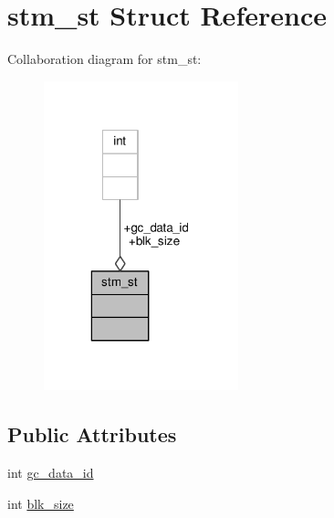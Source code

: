 \hypertarget{structstm__st}{\section{stm\-\_\-st Struct Reference}
\label{structstm__st}
}


Collaboration diagram for stm\-\_\-st\-:
\nopagebreak
\begin{figure}[H]
\begin{center}
\leavevmode
\includegraphics[width=160pt]{structstm__st__coll__graph}
\end{center}
\end{figure}
\subsection*{Public Attributes}
\begin{DoxyCompactItemize}
\item 
int \hyperlink{structstm__st_a8d4aa8ea05094df2806473132aacf807}{gc\-\_\-data\-\_\-id}
\item 
int \hyperlink{structstm__st_a1d180e95b1bb9493a01a4b27ee59fba0}{blk\-\_\-size}
\end{DoxyCompactItemize}


